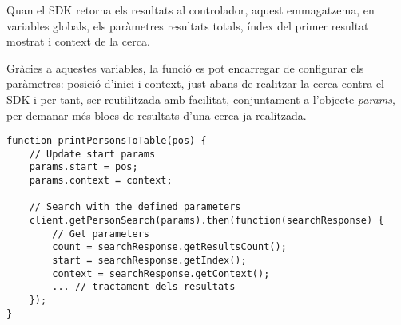 Quan el SDK retorna els resultats al controlador, aquest emmagatzema, en varia\-bles globals, els paràmetres resultats totals, índex del primer resultat mostrat i context de la cerca.

Gràcies a aquestes variables, la funció es pot encarregar de configurar els paràmetres: posició d'inici i context, just abans de realitzar la cerca contra el SDK i per tant, ser reutilitzada amb facilitat, conjuntament a l'objecte \emph{params}, per demanar més blocs de resultats d'una cerca ja realitzada.

\begin{lstlisting}[style=rawOwn,caption={Actualització i utilització dels parametres \emph{count}, \emph{start} i \emph{context}}]
function printPersonsToTable(pos) {
    // Update start params
    params.start = pos;
    params.context = context;

    // Search with the defined parameters
    client.getPersonSearch(params).then(function(searchResponse) {
        // Get parameters
        count = searchResponse.getResultsCount();
        start = searchResponse.getIndex();
        context = searchResponse.getContext();
        ... // tractament dels resultats
    });
}
\end{lstlisting}
